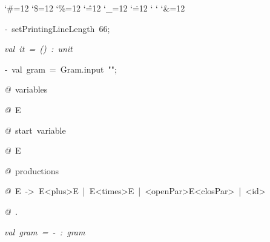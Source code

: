 \begin{list}{}
{\setlength{\leftmargin}{\leftmargini}
\setlength{\rightmargin}{0cm}
\setlength{\itemindent}{0cm}
\setlength{\listparindent}{0cm}
\setlength{\itemsep}{0cm}
\setlength{\parsep}{0cm}
\setlength{\labelsep}{0cm}
\setlength{\labelwidth}{0cm}
\catcode`\#=12
\catcode`\$=12
\catcode`\%=12
\catcode`\^=12
\catcode`\_=12
\catcode`\.=12
\catcode`
\catcode`
\catcode`\&=12
\ttfamily}
\small
\item[]\textsl{-\ }setPrintingLineLength\ 66;
\item[]\textsl{val\ it\ =\ ()\ :\ unit}
\item[]\textsl{-\ }val\ gram\ =\ Gram.input\ "";
\item[]\textsl{@\ }variables
\item[]\textsl{@\ }E
\item[]\textsl{@\ }start\ variable
\item[]\textsl{@\ }E
\item[]\textsl{@\ }productions
\item[]\textsl{@\ }E\ ->\ E<plus>E\ |\ E<times>E\ |\ <openPar>E<closPar>\ |\ <id>
\item[]\textsl{@\ }.
\item[]\textsl{val\ gram\ =\ -\ :\ gram}
\end{list}
